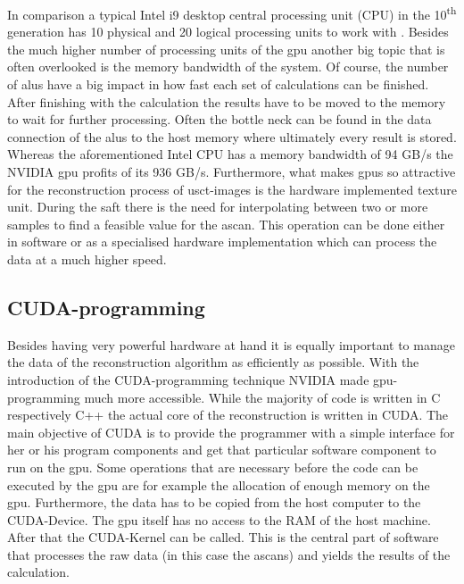 In comparison a typical Intel i9 desktop central processing unit (CPU) in the 10\textsuperscript{th} generation has 10 physical and 20 logical processing units to work with \cite{intel_processor}. Besides the much higher number of processing units of the \ac{gpu} another big topic that is often overlooked is the memory bandwidth of the system. Of course, the number of \acp{alu} have a big impact in how fast each set of calculations can be finished. After finishing with the calculation the results have to be moved to the memory to wait for further processing. Often the bottle neck can be found in the data connection of the \acp{alu} to the host memory where ultimately every result is stored. Whereas the aforementioned Intel CPU has a memory bandwidth of 94 GB/s the NVIDIA \ac{gpu} profits of its 936 GB/s.
Furthermore, what makes \acp{gpu} so attractive for the reconstruction process of \ac{usct}-images is the hardware implemented texture unit. During the \ac{saft} there is the need for interpolating between two or more samples to find a feasible value for the \ac{ascan}. This operation can be done either in software or as a specialised hardware implementation which can process the data at a much higher speed. 


\subsection{CUDA-programming}
Besides having very powerful hardware at hand it is equally important to manage the data of the  reconstruction algorithm as efficiently as possible. With the introduction of the CUDA-programming technique NVIDIA made \ac{gpu}-programming much more accessible.
While the majority of code is written in C respectively C++ the actual core of the reconstruction is written in CUDA. The main objective of CUDA is to provide the programmer with a simple interface for her or his program components and get that particular software component to run on the \ac{gpu}. Some operations that are necessary before the code can be executed by the \ac{gpu} are for example the allocation of enough memory on the \ac{gpu}. Furthermore, the data has to be copied from the host computer to the CUDA-Device. The \ac{gpu} itself has no access to the RAM of the host machine. After that the CUDA-Kernel can be called. This is the central part of software that processes the raw data (in this case the \acp{ascan}) and yields the results of the calculation. 


